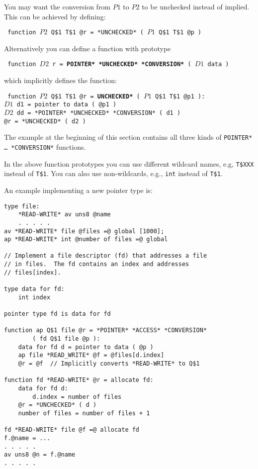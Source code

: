 \documentclass[12pt]{article}
\newcommand{\TT}[1]{{\tt \bfseries #1}}
\newcommand{\ttkey}[1]{{\tt \bfseries #1}}
\newenvironment{indpar}[1][0.3in]%
	{\begin{list}{}%
		     {\setlength{\itemsep}{0in}%
		      \setlength{\topsep}{0in}%
		      \setlength{\parsep}{1ex}%
		      \setlength{\labelwidth}{#1}%
		      \setlength{\leftmargin}{#1}%
		      \addtolength{\leftmargin}{\labelsep}}%
	 \item}%
	{\end{list}}
\begin{document}
You may want the conversion from $P1$ to $P2$ to
be unchecked instead of implied.  This can be achieved by defining:
\begin{indpar} \tt
function $P2$ Q\$1 T\$1 @r = *UNCHECKED* ( $P1$ Q\$1 T\$1 @p )
\end{indpar}
Alternatively you can define a function with prototype
\begin{indpar} \tt
function $D2$ r = \ttkey{*POINTER* *UNCHECKED* *CONVERSION*} ( $D1$ data )
\end{indpar}
which implicitly defines the function:
\begin{indpar} \tt
function $P2$ Q\$1 T\$1 @r = \TT{*UNCHECKED*}
	( $P1$ Q\$1 T\$1 @p1 ): \\
\hspace*{0.3in}$D1$ d1 = pointer to data ( @p1 ) \\
\hspace*{0.3in}$D2$ dd = *POINTER* *UNCHECKED* *CONVERSION* ( d1 ) \\
\hspace*{0.3in}@r = *UNCHECKED* ( d2 )
\end{indpar}

The example at the beginning of this section contains
all three kinds of {\tt *POINTER* \ldots{} *CONVERSION*} functions.

In the above function prototypes you can use different wildcard names,
e.g, {\tt T\$XXX} instead of {\tt T\$1}.  You can also
use non-wildcards, e.g., {\tt int} instead of {\tt T\$1}.

An example implementing a new pointer type is:

\begin{indpar}\begin{verbatim}
type file:
    *READ-WRITE* av uns8 @name
    . . . . .
av *READ-WRITE* file @files =@ global [1000];
ap *READ-WRITE* int @number of files =@ global

// Implement a file descriptor (fd) that addresses a file
// in files.  The fd contains an index and addresses
// files[index].

type data for fd:
    int index

pointer type fd is data for fd

function ap Q$1 file @r = *POINTER* *ACCESS* *CONVERSION*
        ( fd Q$1 file @p ):
    data for fd d = pointer to data ( @p )
    ap file *READ_WRITE* @f = @files[d.index]
    @r = @f  // Implicitly converts *READ-WRITE* to Q$1

function fd *READ-WRITE* @r = allocate fd:
    data for fd d:
        d.index = number of files
    @r = *UNCHECKED* ( d )
    number of files = number of files + 1

fd *READ-WRITE* file @f =@ allocate fd
f.@name = ...
. . . . .
av uns8 @n = f.@name
. . . . .
\end{verbatim}\end{indpar}
\end{document}

